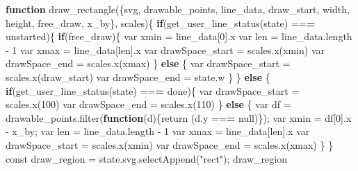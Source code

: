 \documentclass[print]{nuthesis}
\newenvironment{Shaded}{\begin{snugshade}}{\end{snugshade}}
\newcommand{\ControlFlowTok}[1]{\textcolor[rgb]{0.13,0.29,0.53}{\textbf{#1}}}
\newcommand{\DecValTok}[1]{\textcolor[rgb]{0.00,0.00,0.81}{#1}}
\newcommand{\ErrorTok}[1]{\textcolor[rgb]{0.64,0.00,0.00}{\textbf{#1}}}
\newcommand{\FunctionTok}[1]{\textcolor[rgb]{0.00,0.00,0.00}{#1}}
\newcommand{\NormalTok}[1]{#1}
\newcommand{\OtherTok}[1]{\textcolor[rgb]{0.56,0.35,0.01}{#1}}
\newcommand{\SpecialCharTok}[1]{\textcolor[rgb]{0.00,0.00,0.00}{#1}}
\newcommand{\StringTok}[1]{\textcolor[rgb]{0.31,0.60,0.02}{#1}}
\begin{document}
\begin{Shaded}
\begin{Highlighting}[]
\ControlFlowTok{function} \FunctionTok{draw\_rectangle}\NormalTok{(\{svg, drawable\_points, line\_data, draw\_start, width, height, free\_draw, x\_by\}, scales)\{}
    \ControlFlowTok{if}\NormalTok{(}\FunctionTok{get\_user\_line\_status}\NormalTok{(state) }\SpecialCharTok{==}\ErrorTok{=} \StringTok{\textquotesingle{}unstarted\textquotesingle{}}\NormalTok{)\{}
      \ControlFlowTok{if}\NormalTok{(free\_draw)\{}
\NormalTok{         var xmin }\OtherTok{=}\NormalTok{ line\_data[}\DecValTok{0}\NormalTok{].x}
\NormalTok{         var len  }\OtherTok{=}\NormalTok{ line\_data.length }\SpecialCharTok{{-}} \DecValTok{1}
\NormalTok{         var xmax }\OtherTok{=}\NormalTok{ line\_data[len].x}
\NormalTok{         var drawSpace\_start }\OtherTok{=} \FunctionTok{scales.x}\NormalTok{(xmin)}
\NormalTok{         var drawSpace\_end   }\OtherTok{=} \FunctionTok{scales.x}\NormalTok{(xmax)}
\NormalTok{       \} }\ControlFlowTok{else}\NormalTok{ \{}
\NormalTok{         var drawSpace\_start }\OtherTok{=} \FunctionTok{scales.x}\NormalTok{(draw\_start)}
\NormalTok{         var drawSpace\_end   }\OtherTok{=}\NormalTok{ state.w}
\NormalTok{       \}}
\NormalTok{    \} }\ControlFlowTok{else}\NormalTok{ \{}
      \ControlFlowTok{if}\NormalTok{(}\FunctionTok{get\_user\_line\_status}\NormalTok{(state) }\SpecialCharTok{==}\ErrorTok{=} \StringTok{\textquotesingle{}done\textquotesingle{}}\NormalTok{)\{}
\NormalTok{        var drawSpace\_start }\OtherTok{=} \FunctionTok{scales.x}\NormalTok{(}\DecValTok{100}\NormalTok{)}
\NormalTok{        var drawSpace\_end }\OtherTok{=} \FunctionTok{scales.x}\NormalTok{(}\DecValTok{110}\NormalTok{)}
\NormalTok{      \} }\ControlFlowTok{else}\NormalTok{ \{}
\NormalTok{        var df }\OtherTok{=} \FunctionTok{drawable\_points.filter}\NormalTok{(}\ControlFlowTok{function}\NormalTok{(d)\{}\FunctionTok{return}\NormalTok{ (d.y }\SpecialCharTok{==}\ErrorTok{=}\NormalTok{ null)\});}
\NormalTok{        var xmin }\OtherTok{=}\NormalTok{ df[}\DecValTok{0}\NormalTok{].x }\SpecialCharTok{{-}}\NormalTok{ x\_by;}
\NormalTok{        var len  }\OtherTok{=}\NormalTok{ line\_data.length }\SpecialCharTok{{-}} \DecValTok{1}
\NormalTok{        var xmax }\OtherTok{=}\NormalTok{ line\_data[len].x}
\NormalTok{        var drawSpace\_start }\OtherTok{=} \FunctionTok{scales.x}\NormalTok{(xmin)}
\NormalTok{        var drawSpace\_end   }\OtherTok{=} \FunctionTok{scales.x}\NormalTok{(xmax)}
\NormalTok{      \}}
\NormalTok{    \}}
\NormalTok{    const draw\_region }\OtherTok{=} \FunctionTok{state.svg.selectAppend}\NormalTok{(}\StringTok{"rect"}\NormalTok{);}
\NormalTok{    draw\_region}

\end{Highlighting}
\end{Shaded}
\end{document}
